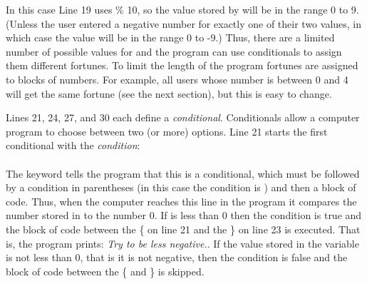 In this case Line 19 uses \% 10, so the value stored by  will be in the range 0 to 9.  (Unless the user entered a negative number for exactly one of their two values, in which case the value will be in the range 0 to -9.)  Thus, there are a limited number of possible values for  and the program can use conditionals to assign them different fortunes.  To limit the length of the program fortunes are assigned to blocks of numbers.  For example, all users whose  number is between 0 and 4 will get the same fortune (see the next section), but this is easy to change.




Lines 21, 24, 27, and 30 each define a \emph{conditional}.  Conditionals allow a computer program to choose between two (or more) options.  
Line 21 starts the first conditional with the \emph{condition}:\\
\\
The keyword  tells the program that this is a conditional, which must be followed by a condition in parentheses (in this case the condition is ) and then a block of code.
Thus, when the computer reaches this line in the program it compares the number stored in  to the number 0.  If  is less than 0 then the condition is true and the block of code between the \{ on line 21 and the \} on line 23 is executed.  That is, the program prints: \emph{Try to be less negative.}. If the value stored in the variable  is not less than 0, that is it is not negative, then the condition is false and the block of code between the \{ and \} is skipped. 

